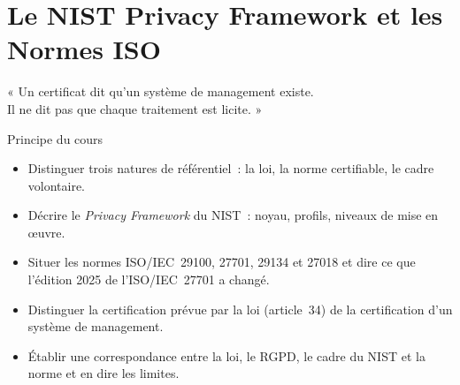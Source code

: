 
\chapter{Le NIST Privacy Framework et les Normes ISO}
\label{chap:normes}

\epigraph{%
    « Un certificat dit qu'un système de management existe.\\
    Il ne dit pas que chaque traitement est licite. »%
}{Principe du cours}


\begin{boxobjectifs}
\begin{itemize}
    \item Distinguer trois natures de référentiel~: la loi, la norme
          certifiable, le cadre volontaire.
    \item Décrire le \textit{Privacy Framework} du NIST~: noyau, profils,
          niveaux de mise en œuvre.
    \item Situer les normes ISO/IEC~29100, 27701, 29134 et 27018 et dire ce
          que l'édition 2025 de l'ISO/IEC~27701 a changé.
    \item Distinguer la certification prévue par la loi (article~34) de la
          certification d'un système de management.
    \item Établir une correspondance entre la loi, le RGPD, le cadre du NIST
          et la norme et en dire les limites.
\end{itemize}
\end{boxobjectifs}

